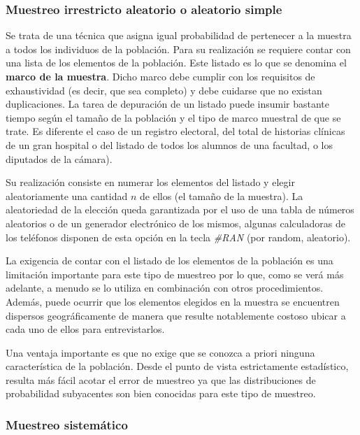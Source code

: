 \documentclass[]{article}
\begin{document}
\hypertarget{muestreo-irrestricto-aleatorio-o-aleatorio-simple}{%
\subsubsection{Muestreo irrestricto aleatorio o aleatorio simple}\label{muestreo-irrestricto-aleatorio-o-aleatorio-simple}}

Se trata de una técnica que asigna igual probabilidad de pertenecer a la
muestra a todos los individuos de la población. Para su realización se
requiere contar con una lista de los elementos de la población. Este
listado es lo que se denomina el \textbf{marco de la muestra}. Dicho marco
debe cumplir con los requisitos de exhaustividad (es decir, que sea
completo) y debe cuidarse que no existan duplicaciones. La tarea de
depuración de un listado puede insumir bastante tiempo según el tamaño
de la población y el tipo de marco muestral de que se trate. Es
diferente el caso de un registro electoral, del total de historias
clínicas de un gran hospital o del listado de todos los alumnos de una
facultad, o los diputados de la cámara).

Su realización consiste en numerar los elementos del listado y elegir
aleatoriamente una cantidad \(n\) de ellos (el tamaño de la muestra). La
aleatoriedad de la elección queda garantizada por el uso de una tabla de
números aleatorios o de un generador electrónico de los mismos, algunas
calculadoras de los teléfonos disponen de esta opción en la tecla \emph{\#RAN} (por random, aleatorio).

La exigencia de contar con el listado de los elementos de la población
es una limitación importante para este tipo de muestreo por lo que, como
se verá más adelante, a menudo se lo utiliza en combinación con otros
procedimientos. Además, puede ocurrir que los elementos elegidos en la
muestra se encuentren dispersos geográficamente de manera que resulte
notablemente costoso ubicar a cada uno de ellos para entrevistarlos.

Una ventaja importante es que no exige que se conozca a priori ninguna
característica de la población. Desde el punto de vista estrictamente
estadístico, resulta más fácil acotar el error de muestreo ya que las
distribuciones de probabilidad subyacentes son bien conocidas para este
tipo de muestreo.

\hypertarget{muestreo-sistematico}{%
\subsubsection{Muestreo sistemático}\label{muestreo-sistematico}}
\end{document}
